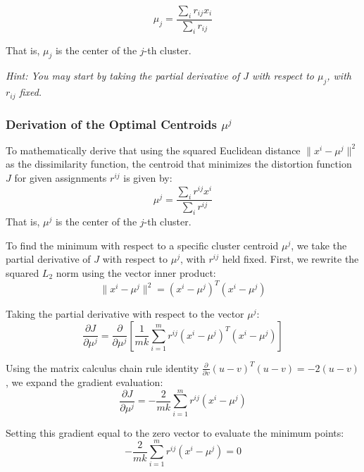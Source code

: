 \documentclass[twoside, 10pt]{article}
\begin{document}
\begin{equation*}
\mu_j = \frac{\sum_{i} r_{ij} x_i}{\sum_{i} r_{ij}}
\end{equation*}

That is, $\mu_j$ is the center of the $j$-th cluster.

\textit{Hint: You may start by taking the partial derivative of $J$ with respect to $\mu_j$, with $r_{ij}$ fixed.}

\subsubsection{Derivation of the Optimal Centroids $\mu^j$}
To mathematically derive that using the squared Euclidean distance $\|x^i - \mu^j\|^2$ as the dissimilarity function, the centroid that minimizes the distortion function $J$ for given assignments $r^{ij}$ is given by:
\begin{equation}
\mu^j = \frac{\sum_{i} r^{ij} x^i}{\sum_{i} r^{ij}}
\end{equation}
That is, $\mu^j$ is the center of the $j$-th cluster.

To find the minimum with respect to a specific cluster centroid $\mu^j$, we take the partial derivative of $J$ with respect to $\mu^j$, with $r^{ij}$ held fixed. First, we rewrite the squared $L_2$ norm using the vector inner product:
\begin{equation}
\|x^i - \mu^j\|^2 = (x^i - \mu^j)^T(x^i - \mu^j)
\end{equation}

Taking the partial derivative with respect to the vector $\mu^j$:
\begin{equation}
\frac{\partial J}{\partial \mu^j} = \frac{\partial}{\partial \mu^j} \left[ \frac{1}{mk} \sum_{i=1}^{m} r^{ij} (x^i - \mu^j)^T(x^i - \mu^j) \right]
\end{equation}

Using the matrix calculus chain rule identity $\frac{\partial}{\partial v} (u - v)^T(u - v) = -2(u - v)$, we expand the gradient evaluation:
\begin{equation}
\frac{\partial J}{\partial \mu^j} = -\frac{2}{mk} \sum_{i=1}^{m} r^{ij}(x^i - \mu^j)
\end{equation}

Setting this gradient equal to the zero vector to evaluate the minimum points:
\begin{equation}
-\frac{2}{mk} \sum_{i=1}^{m} r^{ij}(x^i - \mu^j) = 0
\end{equation}
\end{document}
